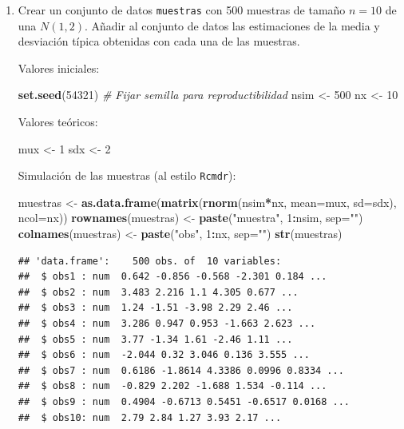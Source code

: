 \documentclass[
]{book}
\newenvironment{Shaded}{\begin{snugshade}}{\end{snugshade}}
\newcommand{\CommentTok}[1]{\textcolor[rgb]{0.56,0.35,0.01}{\textit{#1}}}
\newcommand{\DataTypeTok}[1]{\textcolor[rgb]{0.13,0.29,0.53}{#1}}
\newcommand{\DecValTok}[1]{\textcolor[rgb]{0.00,0.00,0.81}{#1}}
\newcommand{\KeywordTok}[1]{\textcolor[rgb]{0.13,0.29,0.53}{\textbf{#1}}}
\newcommand{\NormalTok}[1]{#1}
\newcommand{\OperatorTok}[1]{\textcolor[rgb]{0.81,0.36,0.00}{\textbf{#1}}}
\newcommand{\StringTok}[1]{\textcolor[rgb]{0.31,0.60,0.02}{#1}}
\theoremstyle{break}
\theoremstyle{definition}
\theoremstyle{definition}
\theoremstyle{definition}
\theoremstyle{remark}
\begin{document}
\begin{enumerate}
\def\labelenumi{\alph{enumi})}
\item
  Crear un conjunto de datos \texttt{muestras} con 500 muestras de tamaño
  \(n=10\) de una \(N(1,2)\). Añadir al conjunto de datos las
  estimaciones de la media y desviación típica obtenidas con cada
  una de las muestras.

  Valores iniciales:

\begin{Shaded}
\begin{Highlighting}[]
\KeywordTok{set.seed}\NormalTok{(}\DecValTok{54321}\NormalTok{) }\CommentTok{# Fijar semilla para reproductibilidad}
\NormalTok{nsim <-}\StringTok{ }\DecValTok{500}
\NormalTok{nx <-}\StringTok{ }\DecValTok{10}
\end{Highlighting}
\end{Shaded}

  Valores teóricos:

\begin{Shaded}
\begin{Highlighting}[]
\NormalTok{mux <-}\StringTok{ }\DecValTok{1}
\NormalTok{sdx <-}\StringTok{ }\DecValTok{2}
\end{Highlighting}
\end{Shaded}

  Simulación de las muestras (al estilo \texttt{Rcmdr}):

\begin{Shaded}
\begin{Highlighting}[]
\NormalTok{muestras <-}\StringTok{ }\KeywordTok{as.data.frame}\NormalTok{(}\KeywordTok{matrix}\NormalTok{(}\KeywordTok{rnorm}\NormalTok{(nsim}\OperatorTok{*}\NormalTok{nx, }\DataTypeTok{mean=}\NormalTok{mux, }\DataTypeTok{sd=}\NormalTok{sdx), }\DataTypeTok{ncol=}\NormalTok{nx))}
\KeywordTok{rownames}\NormalTok{(muestras) <-}\StringTok{ }\KeywordTok{paste}\NormalTok{(}\StringTok{"muestra"}\NormalTok{, }\DecValTok{1}\OperatorTok{:}\NormalTok{nsim, }\DataTypeTok{sep=}\StringTok{""}\NormalTok{)}
\KeywordTok{colnames}\NormalTok{(muestras) <-}\StringTok{ }\KeywordTok{paste}\NormalTok{(}\StringTok{"obs"}\NormalTok{, }\DecValTok{1}\OperatorTok{:}\NormalTok{nx, }\DataTypeTok{sep=}\StringTok{""}\NormalTok{)}
\KeywordTok{str}\NormalTok{(muestras)}
\end{Highlighting}
\end{Shaded}

\begin{verbatim}
## 'data.frame':    500 obs. of  10 variables:
##  $ obs1 : num  0.642 -0.856 -0.568 -2.301 0.184 ...
##  $ obs2 : num  3.483 2.216 1.1 4.305 0.677 ...
##  $ obs3 : num  1.24 -1.51 -3.98 2.29 2.46 ...
##  $ obs4 : num  3.286 0.947 0.953 -1.663 2.623 ...
##  $ obs5 : num  3.77 -1.34 1.61 -2.46 1.11 ...
##  $ obs6 : num  -2.044 0.32 3.046 0.136 3.555 ...
##  $ obs7 : num  0.6186 -1.8614 4.3386 0.0996 0.8334 ...
##  $ obs8 : num  -0.829 2.202 -1.688 1.534 -0.114 ...
##  $ obs9 : num  0.4904 -0.6713 0.5451 -0.6517 0.0168 ...
##  $ obs10: num  2.79 2.84 1.27 3.93 2.17 ...
\end{verbatim}


\end{enumerate}
\end{document}
